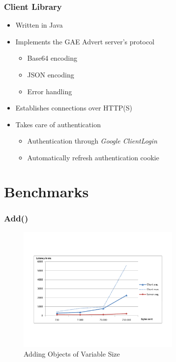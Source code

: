 \documentclass{beamer}
\begin{document}
\frame
{
	\frametitle{Client Library}
	\begin{itemize}
		\item Written in Java
		\item Implements the GAE Advert server's protocol
		\begin{itemize}
			\item Base64 encoding
			\item JSON encoding
			\item Error handling 
        \end{itemize}
        \item Establishes connections over HTTP(S)
		\item Takes care of authentication
		\begin{itemize}
			\item Authentication through \emph{Google ClientLogin}
			\item Automatically refresh authentication cookie
		\end{itemize} 
	\end{itemize}
}

\section{Benchmarks}
\frame
{
	\frametitle{Add()}
	\begin{figure}[t]
	\begin{center}
	\includegraphics[trim=4cm 4cm 4cm 5cm, width=8cm]{add_obj.pdf} 
	\caption{Adding Objects of Variable Size}
	\end{center}
	\end{figure}
}
\end{document}
